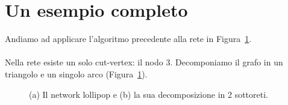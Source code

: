 \section{Un esempio completo}
Andiamo ad applicare l'algoritmo precedente alla rete in Figura~\ref{fig::lollipop}.\\ \\
Nella rete esiste un solo cut-vertex: il nodo $3$. Decomponiamo il grafo in un triangolo e un singolo arco (Figura~\ref{fig::lollipop}).\\
\begin{figure}[!ht]
\centering
{} \hfil
{}
\caption[Lollipop e sua decomposizione]{(a) Il network lollipop e (b) la sua decomposizione in 2 sottoreti.}
\label{fig::lollipop}
\end{figure}

